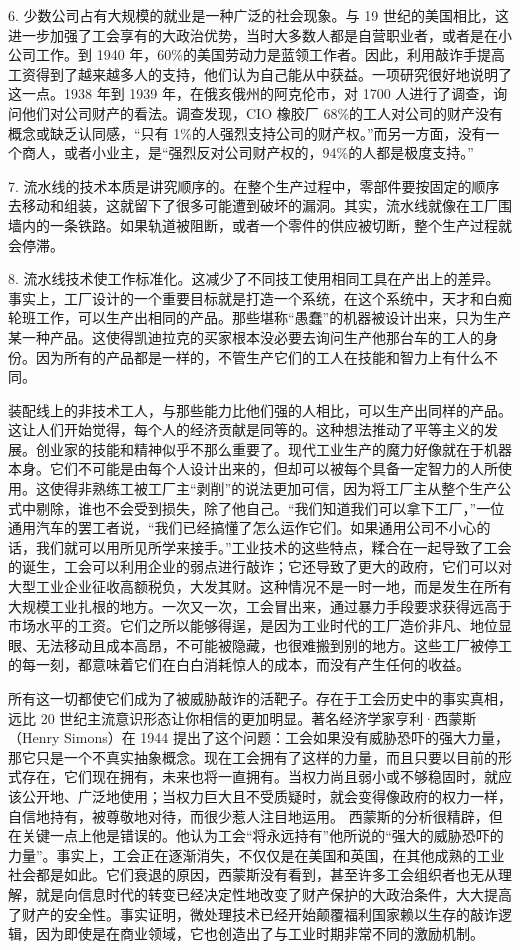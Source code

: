 6. 少数公司占有大规模的就业是一种广泛的社会现象。与 19 世纪的美国相比，这进一步加强了工会享有的大政治优势，当时大多数人都是自营职业者，或者是在小公司工作。到 1940 年，60\%的美国劳动力是蓝领工作者。因此，利用敲诈手提高工资得到了越来越多人的支持，他们认为自己能从中获益。一项研究很好地说明了这一点。1938 年到 1939 年，在俄亥俄州的阿克伦市，对 1700 人进行了调查，询问他们对公司财产的看法。调查发现，CIO 橡胶厂 68\%的工人对公司的财产没有概念或缺乏认同感，“只有 1\%的人强烈支持公司的财产权。”而另一方面，没有一个商人，或者小业主，是“强烈反对公司财产权的，94\%的人都是极度支持。”

7. 流水线的技术本质是讲究顺序的。在整个生产过程中，零部件要按固定的顺序去移动和组装，这就留下了很多可能遭到破坏的漏洞。其实，流水线就像在工厂围墙内的一条铁路。如果轨道被阻断，或者一个零件的供应被切断，整个生产过程就会停滞。

8. 流水线技术使工作标准化。这减少了不同技工使用相同工具在产出上的差异。事实上，工厂设计的一个重要目标就是打造一个系统，在这个系统中，天才和白痴轮班工作，可以生产出相同的产品。那些堪称“愚蠢”的机器被设计出来，只为生产某一种产品。这使得凯迪拉克的买家根本没必要去询问生产他那台车的工人的身份。因为所有的产品都是一样的，不管生产它们的工人在技能和智力上有什么不同。

装配线上的非技术工人，与那些能力比他们强的人相比，可以生产出同样的产品。这让人们开始觉得，每个人的经济贡献是同等的。这种想法推动了平等主义的发展。创业家的技能和精神似乎不那么重要了。现代工业生产的魔力好像就在于机器本身。它们不可能是由每个人设计出来的，但却可以被每个具备一定智力的人所使用。这使得非熟练工被工厂主“剥削”的说法更加可信，因为将工厂主从整个生产公式中剔除，谁也不会受到损失，除了他自己。“我们知道我们可以拿下工厂，”一位通用汽车的罢工者说，“我们已经搞懂了怎么运作它们。如果通用公司不小心的话，我们就可以用所见所学来接手。”工业技术的这些特点，糅合在一起导致了工会的诞生，工会可以利用企业的弱点进行敲诈；它还导致了更大的政府，它们可以对大型工业企业征收高额税负，大发其财。这种情况不是一时一地，而是发生在所有大规模工业扎根的地方。一次又一次，工会冒出来，通过暴力手段要求获得远高于市场水平的工资。它们之所以能够得逞，是因为工业时代的工厂造价非凡、地位显眼、无法移动且成本高昂，不可能被隐藏，也很难搬到别的地方。这些工厂被停工的每一刻，都意味着它们在白白消耗惊人的成本，而没有产生任何的收益。

所有这一切都使它们成为了被威胁敲诈的活靶子。存在于工会历史中的事实真相，远比 20 世纪主流意识形态让你相信的更加明显。著名经济学家亨利·西蒙斯（Henry Simons）在 1944 提出了这个问题：工会如果没有威胁恐吓的强大力量，那它只是一个不真实抽象概念。现在工会拥有了这样的力量，而且只要以目前的形式存在，它们现在拥有，未来也将一直拥有。当权力尚且弱小或不够稳固时，就应该公开地、广泛地使用；当权力巨大且不受质疑时，就会变得像政府的权力一样，自信地持有，被尊敬地对待，而很少惹人注目地运用。 西蒙斯的分析很精辟，但在关键一点上他是错误的。他认为工会“将永远持有”他所说的“强大的威胁恐吓的力量”。事实上，工会正在逐渐消失，不仅仅是在美国和英国，在其他成熟的工业社会都是如此。它们衰退的原因，西蒙斯没有看到，甚至许多工会组织者也无从理解，就是向信息时代的转变已经决定性地改变了财产保护的大政治条件，大大提高了财产的安全性。事实证明，微处理技术已经开始颠覆福利国家赖以生存的敲诈逻辑，因为即使是在商业领域，它也创造出了与工业时期非常不同的激励机制。


